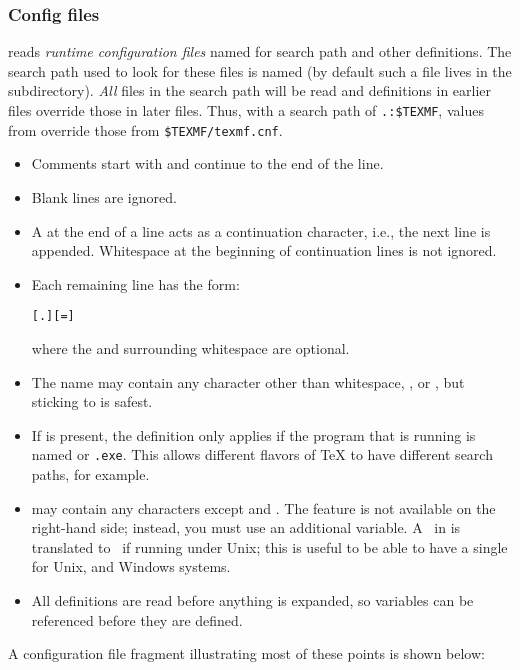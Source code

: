 \documentclass{article}
\begin{document}
\subsubsection{Config files}

\begingroup{}
\KPS{} reads \emph{runtime configuration files} named 
for search path and other definitions.  The search path used to look
for these files is named  (by default such a file lives
in the  subdirectory).  \emph{All}
 files in the search path will be read and definitions
in earlier files override those in later files.  Thus, with a search
path of \verb|.:$TEXMF|, values from  override those
from \verb|$TEXMF/texmf.cnf|.
\endgroup

\begin{itemize}
\item 
  Comments start with \code{\%} and continue to the end of the line.
\item 
  Blank lines are ignored.
\item
  A \bs{} at the end of a line acts as a continuation character,
  i.e., the next line is appended.  Whitespace at the beginning of
  continuation lines is not ignored.
\item 
  Each remaining line has the form:
\begin{alltt}
  [.] [=] 
\end{alltt}%
  where the \samp{=} and surrounding whitespace are optional.
\item 
  The  name may contain any character other
  than whitespace, \samp{=}, or , but sticking to
   is safest.
\item 
  If  is present, the definition only
  applies if the program that is running is named
  \texttt{} or \texttt{.exe}.  This allows
  different flavors of \TeX{} to have different search paths, for
  example.
\item {} may contain any characters except
  \code{\%} and .  The
   feature is not available on the
  right-hand side; instead, you must use an additional variable.  A
  \samp{;}\ in  is translated to \samp{:}\ if
  running under Unix; this is useful to be able to have a single
   for Unix,  and Windows systems.
\item 
  All definitions are read before anything is expanded, so
  variables can be referenced before they are defined.
\end{itemize}
A configuration file fragment illustrating most of these points is
\ifSingleColumn
shown below:
\end{document}
